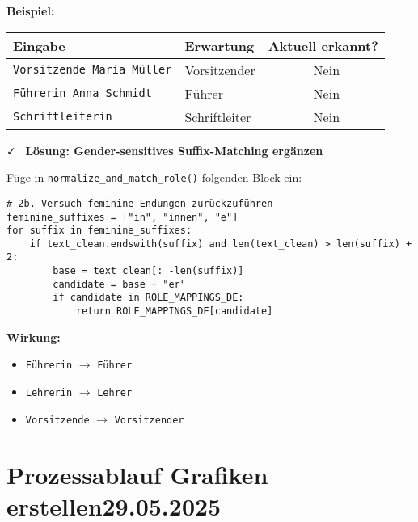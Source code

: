 \documentclass{article}
\newcommand{\xmark}{\ding{55}} %
\begin{document}
\vspace{0.5em}
\textbf{Beispiel:}

\begin{tabular}{|l|l|c|}
\hline
\textbf{Eingabe} & \textbf{Erwartung} & \textbf{Aktuell erkannt?} \\
\hline
\texttt{Vorsitzende Maria Müller} & Vorsitzender & \xmark~Nein \\
\texttt{Führerin Anna Schmidt} & Führer & \xmark~Nein \\
\texttt{Schriftleiterin} & Schriftleiter & \xmark~Nein \\
\hline
\end{tabular}

\vspace{1em}
\faCheck~ \textbf{Lösung: Gender-sensitives Suffix-Matching ergänzen}

Füge in \texttt{normalize\_and\_match\_role()} folgenden Block ein:

\begin{verbatim}
# 2b. Versuch feminine Endungen zurückzuführen
feminine_suffixes = ["in", "innen", "e"]
for suffix in feminine_suffixes:
    if text_clean.endswith(suffix) and len(text_clean) > len(suffix) + 2:
        base = text_clean[: -len(suffix)]
        candidate = base + "er"
        if candidate in ROLE_MAPPINGS_DE:
            return ROLE_MAPPINGS_DE[candidate]
\end{verbatim}

\vspace{0.5em}
\textbf{Wirkung:}

\begin{itemize}
  \item \texttt{Führerin} $\rightarrow$ \texttt{Führer}
  \item \texttt{Lehrerin} $\rightarrow$ \texttt{Lehrer}
  \item \texttt{Vorsitzende} $\rightarrow$ \texttt{Vorsitzender}
\end{itemize}

\vspace{1em}
\noindent\hrulefill

\section{Prozessablauf Grafiken erstellen\small 29.05.2025}
\end{document}
